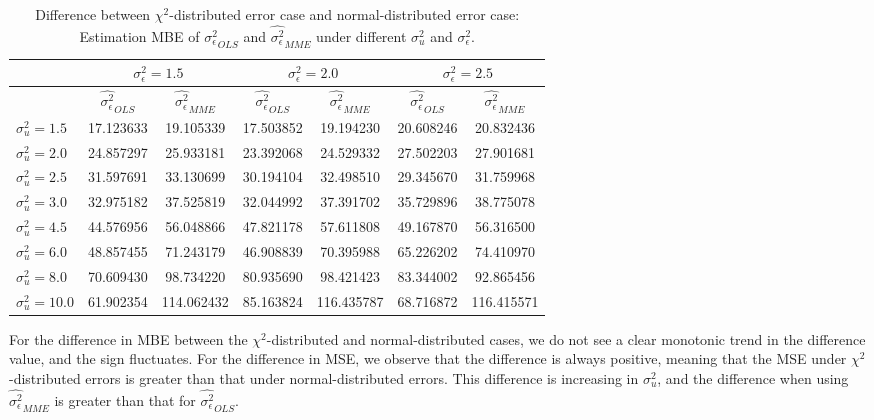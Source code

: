 \documentclass{article}
\begin{document}
\begin{table}[ht]
    \centering
    \caption{Difference between $\chi^2$-distributed error case and normal-distributed error case: Estimation MBE of $\hat{\sigma^2_\epsilon}_{OLS}$ and $\hat{\sigma^2_\epsilon}_{MME}$ under different $\sigma^2_u$ and $\sigma^2_\epsilon$.}
    \label{Tab:MSE_sigma_diff_chi}
    \begin{tabular}[t]{lcccccc}
        \hline
        &\multicolumn{2}{c}{$\sigma^2_\epsilon=1.5$}&\multicolumn{2}{c}{$\sigma^2_\epsilon=2.0$}&\multicolumn{2}{c}{$\sigma^2_\epsilon=2.5$}\\
        \hline
        &$\hat{\sigma^2_\epsilon}_{OLS}$&$\hat{\sigma^2_\epsilon}_{MME}$&$\hat{\sigma^2_\epsilon}_{OLS}$&
        $\hat{\sigma^2_\epsilon}_{MME}$&$\hat{\sigma^2_\epsilon}_{OLS}$&$\hat{\sigma^2_\epsilon}_{MME}$\\
        \hline
        $\sigma^2_u = 1.5$&17.123633&19.105339&17.503852&19.194230&20.608246&20.832436\\
        $\sigma^2_u = 2.0$&24.857297&25.933181&23.392068&24.529332&27.502203&27.901681\\
        $\sigma^2_u = 2.5$&31.597691&33.130699&30.194104&32.498510&29.345670&31.759968\\
        $\sigma^2_u = 3.0$&32.975182&37.525819&32.044992&37.391702&35.729896&38.775078\\
        $\sigma^2_u = 4.5$&44.576956&56.048866&47.821178&57.611808&49.167870&56.316500\\
        $\sigma^2_u = 6.0$&48.857455&71.243179&46.908839&70.395988&65.226202&74.410970\\
        $\sigma^2_u = 8.0$&70.609430&98.734220&80.935690&98.421423&83.344002&92.865456\\
        $\sigma^2_u = 10.0$&61.902354&114.062432&85.163824&116.435787&68.716872&116.415571\\
        \hline
    \end{tabular}
\end{table}

For the difference in MBE between the $\chi^2$-distributed and normal-distributed cases, we do not see a clear monotonic trend in the difference value, and the sign fluctuates. 
For the difference in MSE, we observe that the difference is always positive, meaning that the MSE under $\chi^2$-distributed errors is greater than that under normal-distributed errors.
This difference is increasing in $\sigma^2_u$, and the difference when using $\hat{\sigma^2_\epsilon}_{MME}$ is greater than that for $\hat{\sigma^2_\epsilon}_{OLS}$.
\end{document}
